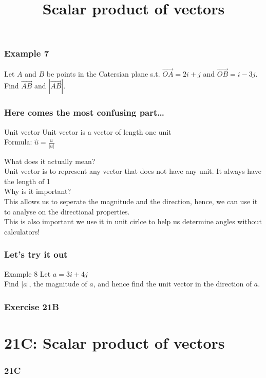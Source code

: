 \documentclass[
	11pt, %
]{beamer}
\begin{document}
\begin{frame}[t]
    \frametitle{Example 7}
    Let $A$ and $B$ be points in the Catersian plane s.t. $\vec{OA} = 2i + j$ and $\vec{OB} = i - 3j$.\\
    Find $\vec{AB}$ and $|\vec{AB}|$.
\end{frame}

\begin{frame}
    \frametitle{Here comes the most confusing part\dots}
    \begin{block}{Unit vector}
        Unit vector is a vector of length one unit\\
        Formula: $\hat{u} = \frac{u}{|u|}$\\
    \end{block}
    What does it actually mean?\\
    Unit vector is to represent any vector that does not have any unit. It always have the length of 1\\
    Why is it important?\\
    This allows us to seperate the magnitude and the direction, hence, we can use it to analyse on the directional properties. \\This is also important 
    we use it in unit cirlce to help us determine angles without calculators!
\end{frame}

\begin{frame}[t]
    \frametitle{Let's try it out}
    \begin{block}{Example 8}
        Let $a = 3i + 4j$\\
        Find $|a|$, the magnitude of $a$, and hence find the unit vector in the direction of $a$.
    \end{block}
\end{frame}

\begin{frame}
    \frametitle{Exercise 21B}
\end{frame}


\section{21C: Scalar product of vectors}
\begin{frame}
    \frametitle{21C}
    \begin{center}
        \title{Scalar product of vectors}
        \maketitle
    \end{center}
\end{frame}
\end{document}

